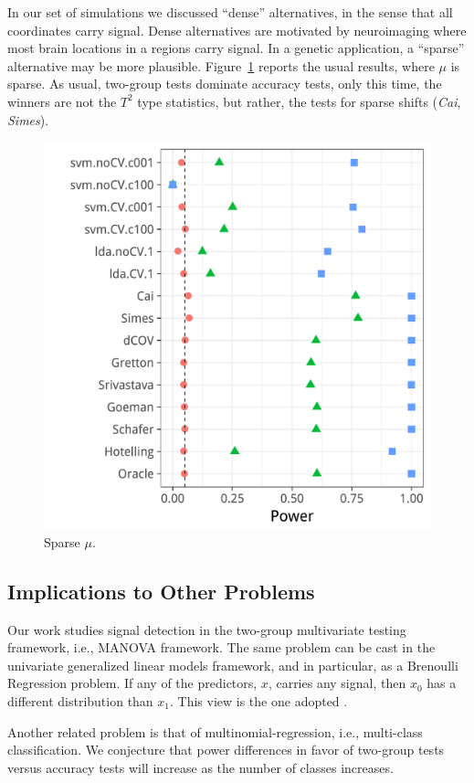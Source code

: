 \documentclass[journal]{IEEEtran}
\begin{document}
In our set of simulations we discussed ``dense'' alternatives, in the sense that all coordinates carry signal.
Dense alternatives are motivated by neuroimaging where most brain locations in a regions carry signal.
In a genetic application, a ``sparse'' alternative may be more plausible. 
Figure~\ref{fig:sparse} reports the usual results, where $\mu$ is sparse. 
As usual, two-group tests dominate accuracy tests, only this time, the winners are not the $T^2$ type statistics, but rather, the tests for sparse shifts (\emph{Cai}, \emph{Simes}).

\begin{figure}[ht]
	\centering
	\label{fig:sparse}	
	\centering
	\includegraphics[width=0.7\columnwidth]{"art/file34"}
	\caption{Sparse $\mu$.}  
\end{figure}



\subsection{Implications to Other Problems}

Our work studies signal detection in the two-group multivariate testing framework, i.e., MANOVA framework.
The same problem can be cast in the univariate generalized linear models framework, and in particular, as a Brenoulli Regression problem.
If any of the predictors, $x$, carries any signal, then $x_0$ has a different distribution than $x_1$.
This view is the one adopted \cite{goeman2006testing}.

Another related problem is that of multinomial-regression, i.e., multi-class classification.
We conjecture that power differences in favor of two-group tests versus accuracy tests will increase as the number of classes increases.
\end{document}
